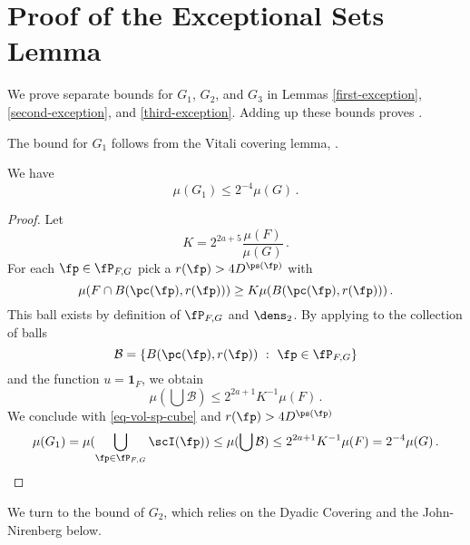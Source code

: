 \section{Proof of the Exceptional Sets Lemma}
\label{subsetexcset}


We prove separate bounds for $G_1$, $G_2$, and $G_3$
in Lemmas \ref{first-exception},
\ref{second-exception}, and \ref{third-exception}. Adding up these bounds proves .

The bound for $G_1$ follows from the Vitali covering lemma, .

\begin{lemma}
    \label{first-exception}
    \leanok
    We have
    \begin{equation}
        \mu(G_1)\le 2^{-4}\mu(G)\, .
    \end{equation}
\end{lemma}
\begin{proof}
    Let
    $$
        K = 2^{2a+5}\frac{\mu(F)}{\mu(G)}\,.
    $$
    For each $\fp\in \fP_{F,G}$ pick a
    $r(\fp)>4D^{\ps(\fp)}$ with
    $$
    {\mu(F\cap B(\pc(\fp),r(\fp)))}\ge K{\mu(B(\pc(\fp),r(\fp)))}\, .
    $$
    This ball exists by definition of $\fP_{F,G}$
    and $\dens_2$. By applying to the collection of balls
    $$
        \mathcal{B} = \{B(\pc(\fp),r(\fp)) \ : \ \fp \in \fP_{F,G}\}
    $$
    and the function $u = \mathbf{1}_F$, we obtain
    $$
        \mu(\bigcup \mathcal{B}) \le 2^{2a+1} K^{-1} \mu(F)\,.
    $$
    We conclude with \eqref{eq-vol-sp-cube} and $r(\fp)>4D^{\ps(\fp)}$
    $$
        \mu(G_1)= \mu(\bigcup_{\fp\in \fP_{F,G}} \scI(\fp))
        \le \mu(\bigcup \mathcal{B})\le 2^{2a+1} K^{-1} \mu (F) = 2^{-4}\mu(G)\,.
    $$
\end{proof}


We turn to the bound of $G_2$, which relies on the Dyadic Covering  and the
John-Nirenberg  below.

